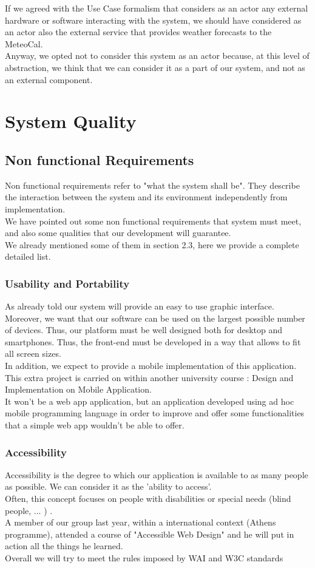 \documentclass[12pt]{book}
\begin{document}
If we agreed with the Use Case formalism that considers as an actor any external hardware or software interacting with the system, we should have considered as an actor also the external service that provides weather forecasts to the MeteoCal. \\
Anyway, we opted not to consider this system as an actor because, at this level of abstraction, we think that we can consider it as a part of our system, and not as an external component.   

\chapter{System Quality}
\section{Non functional Requirements}

Non functional requirements refer to "what the system shall be". They describe the interaction between the system and its environment independently from implementation.\\
We have pointed out some non functional requirements that system must meet, and also some qualities that our development will guarantee.\\ We already mentioned some of them in section 2.3, here we provide a complete detailed list.
	\subsection{Usability and Portability}
		 As already told our system will provide an easy to use graphic interface. Moreover, we want that our software can be used on the largest possible number of devices. Thus, our platform must be well designed both for desktop and smartphones. Thus, the front-end must be developed in a way that allows to fit all screen sizes. \\ 
		In addition, we expect to provide a mobile implementation of this application. This extra project is carried on within another university course : Design and Implementation on Mobile Application.  \\ It won't be a web app application, but an application developed using ad hoc mobile programming language in order to improve and offer some functionalities that a simple web app wouldn't be able to offer.\\
	\subsection{Accessibility}
		Accessibility is the degree to which our application is available to as many people as possible. We can consider it as the 'ability to access'. \\ Often, this concept focuses on people with disabilities or special needs (blind people, ... ) . \\
		A member of our group last year, within a international context (Athens programme), attended a course of "Accessible Web Design" and he will put in action all the things he learned. \\
		Overall we will try to meet the rules imposed by WAI and W3C standards \\ 
\end{document}
